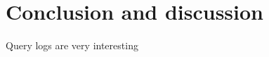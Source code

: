 \documentclass{sig-alternate}
\begin{document}
\section{Conclusion and discussion}
\label{sec:conclusion}

Query logs are very interesting

\let\oldsection\section
\renewcommand{\section}[2][1]{\oldsection{#1}\vspace{-3pt}}



\end{document}
